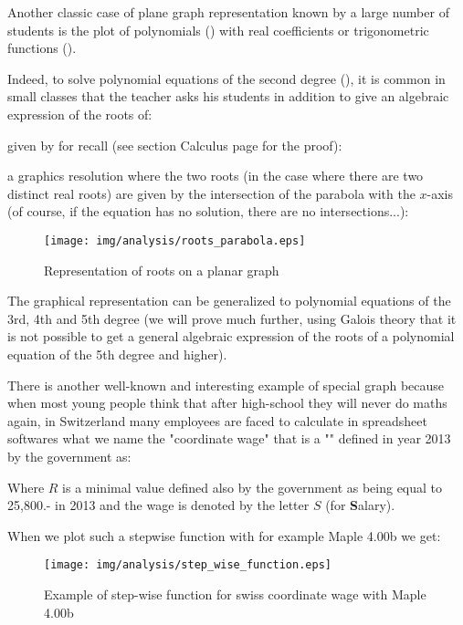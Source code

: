 Another classic case of plane graph representation  known by a large number of students is the plot of polynomials () with real coefficients or trigonometric functions ().

Indeed, to solve polynomial equations of the second degree (), it is common in small classes that the teacher asks his students in addition to give an algebraic expression of the roots of:
	
given by for recall (see section Calculus page \pageref{double root} for the proof):
	
a graphics resolution where the two roots (in the case where there are two distinct real roots) are given by the intersection of the parabola with the $x$-axis (of course, if the equation has no solution, there are no intersections...):

\begin{figure}[H]
\centering
\texttt{[image: img/analysis/roots\_parabola.eps]}
\caption{Representation of roots on a planar graph}
\end{figure}

The graphical representation can be generalized to polynomial equations of the 3rd, 4th and 5th degree (we will prove much further, using Galois theory that it is not possible to get a general algebraic expression of the roots of a polynomial equation of the 5th degree and higher).

There is another well-known and interesting example of special graph because when most young people think that after high-school they will never do maths again, in Switzerland many employees are faced to calculate in spreadsheet softwares what we name the "coordinate wage" that is a "" defined in year 2013 by the government as:

	

Where $R$ is a minimal value defined also by the government as being equal to 25,800.- in 2013 and the wage is denoted by the letter $S$ (for \textbf{S}alary).

When we plot such a stepwise function with for example Maple 4.00b we get:

\begin{figure}[H]
\centering
\texttt{[image: img/analysis/step\_wise\_function.eps]}
\caption{Example of step-wise function for swiss coordinate wage with Maple 4.00b}
\end{figure}

